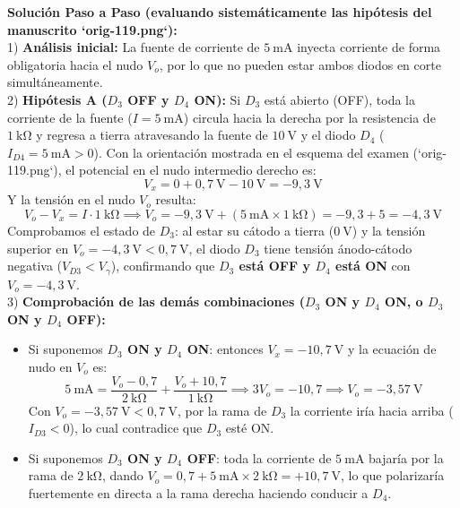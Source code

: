 \begin{ejercicio}
\textbf{Solución Paso a Paso (evaluando sistemáticamente las hipótesis del manuscrito `orig-119.png`):}\\[4pt]
1) \textbf{Análisis inicial:} La fuente de corriente de $5\ \si{\milli\ampere}$ inyecta corriente de forma obligatoria hacia el nudo $V_o$, por lo que no pueden estar ambos diodos en corte simultáneamente.\\[4pt]
2) \textbf{Hipótesis A ($D_3$ OFF y $D_4$ ON):}
Si $D_3$ está abierto (OFF), toda la corriente de la fuente ($I = 5\ \si{\milli\ampere}$) circula hacia la derecha por la resistencia de $1\ \si{\kilo\ohm}$ y regresa a tierra atravesando la fuente de $10\ \si{\volt}$ y el diodo $D_4$ ($I_{D4} = 5\ \si{\milli\ampere} > 0$).
Con la orientación mostrada en el esquema del examen (`orig-119.png`), el potencial en el nudo intermedio derecho es:
\begin{equation}
    V_x = 0 + 0{,}7\ \si{\volt} - 10\ \si{\volt} = -9{,}3\ \si{\volt}
\end{equation}
Y la tensión en el nudo $V_o$ resulta:
\begin{equation}
    V_o - V_x = I \cdot 1\ \si{\kilo\ohm} \implies V_o = -9{,}3\ \si{\volt} + (5\ \si{\milli\ampere} \times 1\ \si{\kilo\ohm}) = -9{,}3 + 5 = -4{,}3\ \si{\volt}
\end{equation}
Comprobamos el estado de $D_3$: al estar su cátodo a tierra ($0\ \si{\volt}$) y la tensión superior en $V_o = -4{,}3\ \si{\volt} < 0{,}7\ \si{\volt}$, el diodo $D_3$ tiene tensión ánodo-cátodo negativa ($V_{D3} < V_\gamma$), confirmando que \textbf{$D_3$ está OFF y $D_4$ está ON} con $V_o = -4{,}3\ \si{\volt}$.\\[4pt]
3) \textbf{Comprobación de las demás combinaciones ($D_3$ ON y $D_4$ ON, o $D_3$ ON y $D_4$ OFF):}
\begin{itemize}[leftmargin=*]
    \item Si suponemos \textbf{$D_3$ ON y $D_4$ ON}: entonces $V_x = -10{,}7\ \si{\volt}$ y la ecuación de nudo en $V_o$ es:
    \begin{equation}
        5\ \si{\milli\ampere} = \frac{V_o - 0{,}7}{2\ \si{\kilo\ohm}} + \frac{V_o + 10{,}7}{1\ \si{\kilo\ohm}} \implies 3 V_o = -10{,}7 \implies V_o = -3{,}57\ \si{\volt}
    \end{equation}
    Con $V_o = -3{,}57\ \si{\volt} < 0{,}7\ \si{\volt}$, por la rama de $D_3$ la corriente iría hacia arriba ($I_{D3} < 0$), lo cual contradice que $D_3$ esté ON.
    \item Si suponemos \textbf{$D_3$ ON y $D_4$ OFF}: toda la corriente de $5\ \si{\milli\ampere}$ bajaría por la rama de $2\ \si{\kilo\ohm}$, dando $V_o = 0{,}7 + 5\ \si{\milli\ampere} \times 2\ \si{\kilo\ohm} = +10{,}7\ \si{\volt}$, lo que polarizaría fuertemente en directa a la rama derecha haciendo conducir a $D_4$.
\end{itemize}
\end{ejercicio}

